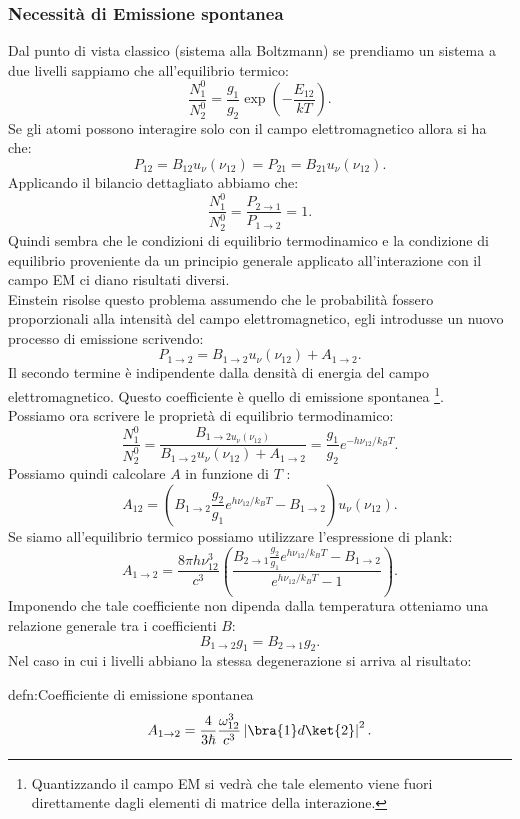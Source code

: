 \subsubsection{Necessità di Emissione spontanea}%
Dal punto di vista classico (sistema alla Boltzmann) se prendiamo un sistema a due livelli sappiamo che all'equilibrio termico:
\[
    \frac{N_1^0}{N_2^0}= \frac{g_1}{g_2}\exp\left(-\frac{E_{12}}{kT}\right)
.\] 
Se gli atomi possono interagire solo con il campo elettromagnetico allora si ha che:
\[
    P_{12} = B_{12}u_{\nu}(\nu_{12}) =P_{21}=B_{21}u_{\nu}(\nu_{12}) 
.\] 
Applicando il bilancio dettagliato abbiamo che:
\[
\frac{N_1^0}{N_2^0} = \frac{P_{2\to 1}}{P_{1\to 2}} = 1
.\] 
Quindi sembra che le condizioni di equilibrio termodinamico e la condizione di equilibrio proveniente da un principio generale applicato all'interazione con il campo EM ci diano risultati diversi. \\
Einstein risolse questo problema assumendo che le probabilità fossero proporzionali alla intensità del campo elettromagnetico, egli introdusse un nuovo processo di emissione scrivendo:
\[
    P_{1\to 2}= B_{1\to 2}u_{\nu}(\nu_{12})  + A_{1\to 2}
.\] 
Il secondo termine è indipendente dalla densità di energia del campo elettromagnetico. Questo coefficiente è quello di emissione spontanea \footnote{Quantizzando il campo EM si vedrà che tale elemento viene fuori direttamente dagli elementi di matrice della interazione.}.\\
Possiamo ora scrivere le proprietà di equilibrio termodinamico:
\[
    \frac{N_1^0}{N_2^0} = \frac{B_{1\to 2 u_\nu(\nu_{12})}}{B_{1\to 2}u_\nu(\nu_{12}) + A_{1\to 2}} = \frac{g_1}{g_2}e^{-h\nu_{12} /k_BT}
.\] 
Possiamo quindi calcolare $A$  in funzione di $T$  :
\[
    A_{12} = \left(B_{1\to 2}\frac{g_2}{g_1}e^{h\nu_{12} /k_BT}-B_{1\to 2}\right)u_\nu(\nu_{12}) 
.\] 
Se siamo all'equilibrio termico possiamo utilizzare l'espressione di plank:
\[
A_{1\to 2} =
\frac{8\pi h\nu_{12}^3}{c^3}\left(\frac{B_{2\to 1}\frac{g_2}{g_1}e^{h\nu_{12} /k_BT}-B_{1\to 2}}{e^{h\nu_{12} /k_BT}-1}\right)
.\] 
Imponendo che tale coefficiente non dipenda dalla temperatura otteniamo una relazione generale tra i coefficienti $B$:
\[
B_{1\to 2}g_1=B_{2\to 1}g_2
.\] 
Nel caso in cui i livelli abbiano la stessa degenerazione si arriva al risultato:
\begin{defn}{defn:Coefficiente di emissione spontanea}
\[
A_{1\to 2}=\frac{4}{3\hbar }\frac{\omega_{12}^3}{c ^3}\left|\bra{1}d\ket{2}\right|^2
.\] 
\end{defn}
